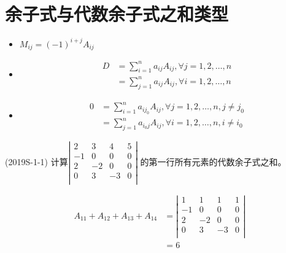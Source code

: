 \documentclass[lang=cn,newtx,10pt,scheme=chinese]{elegantbook}
\begin{document}
\section{余子式与代数余子式之和类型}

\begin{itemize}
    \item $M_{ij} = (-1)^{i+j}A_{ij}$
    \item 
    \begin{align*}
        D &= \sum_{i = 1}^n a_{ij}A_{ij},\forall j = 1,2,\dots,n \\
        &= \sum_{j = 1}^n a_{ij}A_{ij},\forall i = 1,2,\dots,n
    \end{align*}
    \item \begin{align*}
        0 &= \sum_{i = 1}^n a_{ij_0}A_{ij},\forall j = 1,2,\dots,n,j \neq j_0 \\
        &= \sum_{j = 1}^n a_{i_0j}A_{ij},\forall i = 1,2,\dots,n,i \neq i_0
    \end{align*}
\end{itemize}

\begin{example}
  (2019S-1-1) 计算$
  \left|
    \begin{array}{cccc}
        2   & 3   & 4   & 5 \\
        -1  & 0   & 0   & 0 \\
        2   & -2  & 0   & 0 \\
        0   & 3   & -3  & 0 \\
    \end{array}
  \right|
  $
  的第一行所有元素的代数余子式之和。
\end{example}

\begin{solution}
    \begin{align*}
        A_{11} + A_{12} + A_{13} + A_{14} &= 
        \left|
        \begin{array}{cccc}
            1   & 1   & 1   & 1 \\
            -1  & 0   & 0   & 0 \\
            2   & -2  & 0   & 0 \\
            0   & 3   & -3  & 0 \\
        \end{array}
        \right| \\
        &= 6
    \end{align*}
\end{solution}
\end{document}
